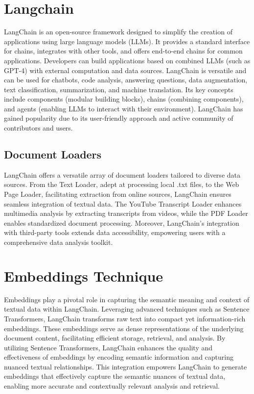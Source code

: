 \documentclass[12pt,a4paper,oneside]{report}
\begin{document}
\section{Langchain}
\par  LangChain is an open-source framework designed to simplify the creation of applications using large language models (LLMs). It provides a standard interface for chains, integrates with other tools, and offers end-to-end chains for common applications. Developers can build applications based on combined LLMs (such as GPT-4) with external computation and data sources. LangChain is versatile and can be used for chatbots, code analysis, answering questions, data augmentation, text classification, summarization, and machine translation. Its key concepts include components (modular building blocks), chains (combining components), and agents (enabling LLMs to interact with their environment). LangChain has gained popularity due to its user-friendly approach and active community of contributors and users.

\subsection{Document Loaders}
\hspace{1cm} LangChain offers a versatile array of document loaders tailored to diverse data sources. From the Text Loader, adept at processing local .txt files, to the Web Page Loader, facilitating extraction from online sources, LangChain ensures seamless integration of textual data. The YouTube Transcript Loader enhances multimedia analysis by extracting transcripts from videos, while the PDF Loader enables standardized document processing. Moreover, LangChain's integration with third-party tools extends data accessibility, empowering users with a comprehensive data analysis toolkit.

\section{Embeddings Technique}
\hspace{1cm} Embeddings play a pivotal role in capturing the semantic meaning and context of textual data within LangChain. Leveraging advanced techniques such as Sentence Transformers, LangChain transforms raw text into compact yet information-rich embeddings. These embeddings serve as dense representations of the underlying document content, facilitating efficient storage, retrieval, and analysis. By utilizing Sentence Transformers, LangChain enhances the quality and effectiveness of embeddings by encoding semantic information and capturing nuanced textual relationships. This integration empowers LangChain to generate embeddings that effectively capture the semantic nuances of textual data, enabling more accurate and contextually relevant analysis and retrieval.
\end{document}
